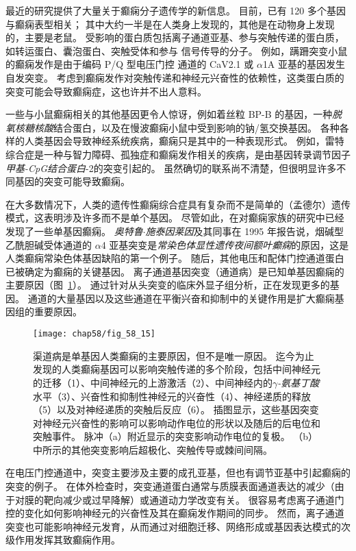 最近的研究提供了大量关于癫痫分子遗传学的新信息。 目前，已有 120 多个基因与癫痫表型相关；
其中大约一半是在人类身上发现的，其他是在动物身上发现的，主要是老鼠。
受影响的蛋白质包括离子通道亚基、参与突触传递的蛋白质，如转运蛋白、囊泡蛋白、突触受体和参与  信号传导的分子。
例如，蹒跚突变小鼠的癫痫发作是由于编码 P/Q 型电压门控  通道的 CaV2.1 或 $\alpha$1A 亚基的基因发生自发突变。
考虑到癫痫发作对突触传递和神经元兴奋性的依赖性，这类蛋白质的突变可能会导致癫痫症，这也许并不出人意料。


一些与小鼠癫痫相关的其他基因更令人惊讶，例如着丝粒 BP-B 的基因，一种\textit{脱氧核糖核酸}结合蛋白，以及在慢波癫痫小鼠中受到影响的钠/氢交换基因。
各种各样的人类基因会导致神经系统疾病，癫痫只是其中的一种表现形式。
例如，雷特综合症是一种与智力障碍、孤独症和癫痫发作相关的疾病，是由基因转录调节因子\textit{甲基-CpG结合蛋白}-2的突变引起的。
虽然确切的联系尚不清楚，但很明显许多不同基因的突变可能导致癫痫。


在大多数情况下，人类的遗传性癫痫综合症具有复杂而不是简单的（孟德尔）遗传模式，这表明涉及许多而不是单个基因。
尽管如此，在对癫痫家族的研究中已经发现了一些单基因癫痫。
\textit{奥特鲁$\cdot$施泰因莱因}及其同事在 1995 年报告说，烟碱型乙酰胆碱受体通道的 $\alpha$4 亚基突变是\textit{常染色体显性遗传夜间额叶癫痫}的原因，这是人类癫痫常染色体基因缺陷的第一个例子。
随后，其他电压和配体门控通道蛋白已被确定为癫痫的关键基因。
离子通道基因突变（通道病）是已知单基因癫痫的主要原因（图~\ref{fig:58_15}）。
通过针对从头突变的临床外显子组分析，正在发现更多的基因。
 通道的大量基因以及这些通道在平衡兴奋和抑制中的关键作用是扩大癫痫基因组的重要原因。


\begin{figure}[htbp]
	\centering
	\texttt{[image: chap58/fig\_58\_15]}
	\caption{渠道病是单基因人类癫痫的主要原因，但不是唯一原因。
		迄今为止发现的人类癫痫基因可以影响突触传递的多个阶段，包括中间神经元的迁移（1）、中间神经元的上游激活（2）、中间神经内的\textit{$\gamma$-氨基丁酸}水平（3）、兴奋性和抑制性神经元的兴奋性（4）、神经递质的释放（5）以及对神经递质的突触后反应（6）。
		插图显示，这些基因突变对神经元兴奋性的影响可以影响动作电位的形状以及随后的后电位和突触事件。
		脉冲（a）附近显示的突变影响动作电位的复极。
		（b）中所示的其他突变影响后超极化、突触传导或棘间间隔。}
	\label{fig:58_15}
\end{figure}


在电压门控通道中，突变主要涉及主要的成孔亚基，但也有调节亚基中引起癫痫的突变的例子。
在体外检查时，突变通道蛋白通常与质膜表面通道表达的减少（由于对膜的靶向减少或过早降解）或通道动力学改变有关。
很容易考虑离子通道门控的变化如何影响神经元的兴奋性及其在癫痫发作期间的同步。
然而，离子通道突变也可能影响神经元发育，从而通过对细胞迁移、网络形成或基因表达模式的次级作用发挥其致癫痫作用。


